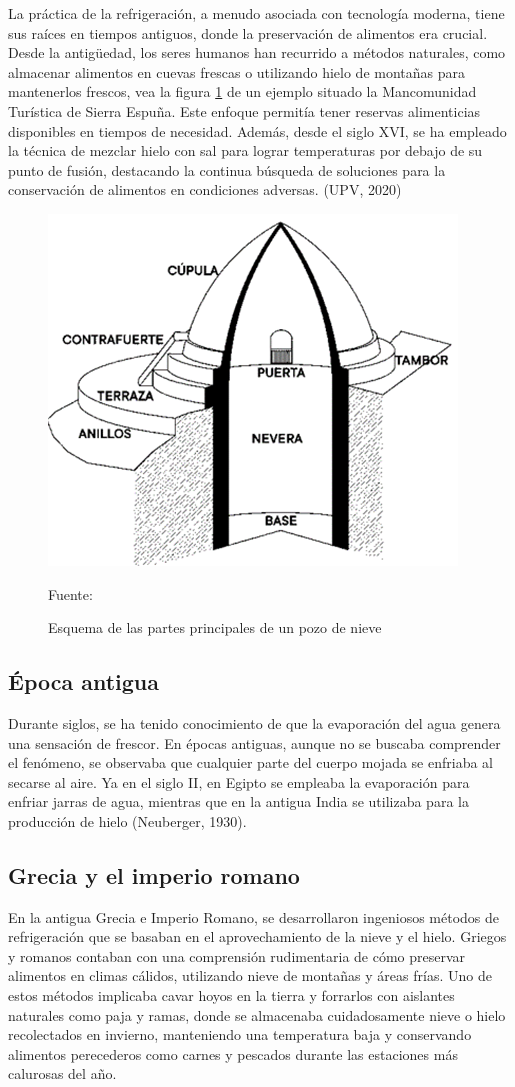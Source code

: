 La práctica de la refrigeración, a menudo asociada con tecnología moderna, tiene sus raíces en tiempos antiguos, donde la preservación de alimentos era crucial. Desde la antigüedad, los seres humanos han recurrido a métodos naturales, como almacenar alimentos en cuevas frescas o utilizando hielo de montañas para mantenerlos frescos, vea la figura \ref{fig:pozo-nieve} de un ejemplo situado la Mancomunidad Turística de Sierra Espuña. Este enfoque permitía tener reservas alimenticias disponibles en tiempos de necesidad. Además, desde el siglo XVI, se ha empleado la técnica de mezclar hielo con sal para lograr temperaturas por debajo de su punto de fusión, destacando la continua búsqueda de soluciones para la conservación de alimentos en condiciones adversas. (UPV, 2020)

\begin{figure}[H]
	\centering
	\includegraphics[width=0.6\linewidth]{figures/pozo-nieve}
	\caption{Esquema de las partes principales de un pozo de nieve}
		Fuente: \cite{ecoproyecta2024}
	\label{fig:pozo-nieve}
\end{figure}

\subsection{Época antigua}

Durante siglos, se ha tenido conocimiento de que la evaporación del agua genera una sensación de frescor. En épocas antiguas, aunque no se buscaba comprender el fenómeno, se observaba que cualquier parte del cuerpo mojada se enfriaba al secarse al aire. Ya en el siglo II, en Egipto se empleaba la evaporación para enfriar jarras de agua, mientras que en la antigua India se utilizaba para la producción de hielo (Neuberger, 1930).


\subsection{Grecia y el imperio romano}
En la antigua Grecia e Imperio Romano, se desarrollaron ingeniosos métodos de refrigeración que se basaban en el aprovechamiento de la nieve y el hielo. Griegos y romanos contaban con una comprensión rudimentaria de cómo preservar alimentos en climas cálidos, utilizando nieve de montañas y áreas frías. Uno de estos métodos implicaba cavar hoyos en la tierra y forrarlos con aislantes naturales como paja y ramas, donde se almacenaba cuidadosamente nieve o hielo recolectados en invierno, manteniendo una temperatura baja y conservando alimentos perecederos como carnes y pescados durante las estaciones más calurosas del año.

